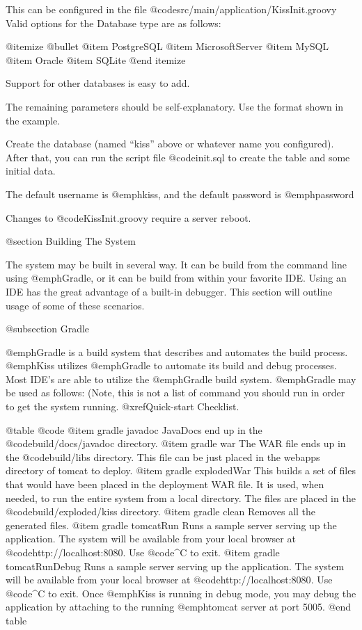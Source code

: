 This can be configured in the file @code{src/main/application/KissInit.groovy}
Valid options for the Database type are as follows:

@itemize @bullet
@item
PostgreSQL
@item
MicrosoftServer
@item
MySQL
@item
Oracle
@item
SQLite
@end itemize

Support for other databases is easy to add.

The remaining parameters should be self-explanatory.  Use the format
shown in the example.

Create the database (named ``kiss'' above or whatever name you
configured).  After that, you can run the script file @code{init.sql}
to create the table and some initial data.

The default username is @emph{kiss}, and the default password is
@emph{password}

Changes to  @code{KissInit.groovy} require a server reboot.

@section Building The System

The system may be built in several way.  It can be build from the
command line using @emph{Gradle}, or it can be build from within your
favorite IDE.  Using an IDE has the great advantage of a built-in
debugger.  This section will outline usage of some of these scenarios.

@subsection Gradle 

@emph{Gradle} is a build system that describes and automates the build process.
@emph{Kiss} utilizes @emph{Gradle} to automate its build and debug processes.
Most IDE's are able to utilize the @emph{Gradle} build system.
@emph{Gradle} may be used as follows:
(Note, this is not a list of command you should run in order to get the system running.  
@xref{Quick-start Checklist}.

@table @code
@item gradle javadoc
JavaDocs end up in the @code{build/docs/javadoc} directory.
@item gradle war
The WAR file ends up in the @code{build/libs} directory.  
This file can be just placed in the webapps directory of tomcat to deploy.
@item gradle explodedWar
This builds a set of files that would have been placed in the deployment WAR file.  It is used, when needed,
to run the entire system from a local directory.  The files are placed in the @code{build/exploded/kiss}
directory.
@item gradle clean
Removes all the generated files.
@item gradle tomcatRun
Runs a sample server serving up the application.  The system will be
available from your local browser at
@code{http://localhost:8080}.  Use @code{^C} to exit.
@item gradle tomcatRunDebug
Runs a sample server serving up the application.  The system will be
available from your local browser at
@code{http://localhost:8080}.  Use @code{^C} to exit. Once @emph{Kiss} is running in debug mode,
you may debug the application by attaching to the running @emph{tomcat} server at port 5005.
@end table

